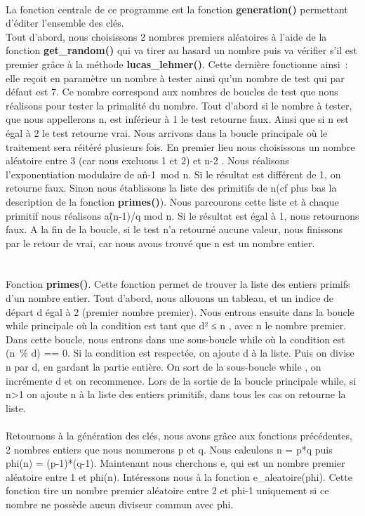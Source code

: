 \documentclass[11pt,fleqn]{book} %
\begin{document}
\paragraph{}La fonction centrale de ce programme est la fonction \textbf{generation()} permettant d'éditer l'ensemble des clés.
\\Tout d'abord, nous choisissons 2 nombres premiers aléatoires à l'aide de la fonction \textbf{get\_random()} qui va tirer au hasard un nombre puis va vérifier s'il est premier grâce à la méthode \textbf{lucas\_lehmer()}.
Cette dernière fonctionne ainsi : elle reçoit en paramètre un nombre à tester ainsi qu'un nombre de test qui par défaut est 7. Ce nombre correspond aux nombres de boucles de test que nous réalisons pour tester la primalité du nombre. Tout d'abord si le nombre à tester, que nous appellerons n, est inférieur à 1 le test retourne faux. Ainsi que si n est égal à 2 le test retourne vrai. Nous arrivons dans la boucle principale où le traitement sera réitéré plusieurs fois. En premier lieu nous choisissons un nombre aléatoire entre 3 (car nous excluons 1 et 2) et n-2 . Nous réalisons l’exponentiation modulaire de a\^n-1 mod n. Si le résultat est différent de 1,  on retourne faux. Sinon nous établissons la liste des primitifs de n(cf plus bas la description de la fonction \textbf{primes()}). Nous parcourons cette liste et à chaque primitif nous réalisons a\^(n-1)/q mod n. Si le résultat est égal à 1, nous retournons faux. A la fin de la boucle, si le test n'a retourné aucune valeur, nous finissons par le retour de vrai, car nous avons trouvé que n est un nombre entier.
\\\\\\Fonction \textbf{primes()}. Cette fonction permet de trouver la liste des entiers primifs d'un nombre entier. Tout d'abord, nous allouons un tableau, et un indice de départ d égal à 2 (premier nombre premier). Nous entrons ensuite dans la boucle while principale où la condition est tant que d² ≤ n , avec n le nombre premier. Dans cette boucle, nous entrons dans une sous-boucle while  où la condition est (n \% d) == 0. Si la condition est respectée, on ajoute d à la liste. Puis on divise n par d, en gardant la partie entière. On sort de la sous-boucle while , on incrémente d et on recommence. Lors de la sortie de la boucle principale while, si n>1 on ajoute n à la liste des entiers primitifs, dans tous les cas on retourne la liste.
\\\\Retournons à la génération des clés, nous avons grâce aux fonctions précédentes, 2 nombres entiers que nous nommerons p et q. Nous calculons n = p*q puis phi(n) = (p-1)*(q-1). Maintenant nous cherchons e, qui est un nombre premier aléatoire entre 1 et phi(n). Intéressons nous à la fonction e\_aleatoire(phi). Cette fonction tire un nombre premier aléatoire entre 2 et phi-1 uniquement si ce nombre ne possède aucun diviseur commun avec phi.
\end{document}
